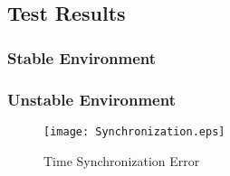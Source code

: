 \documentclass[Main]{subfiles}
\begin{document}

	\subsection{Test Results} %
	\label{sub:test_results}

		\subsubsection{Stable Environment} %
		\label{sub:stable_environment}
		

		\subsubsection{Unstable Environment} %
		\label{sub:unstable_environment}
			
			\begin{figure}[H]
				\centering
				\texttt{[image: Synchronization.eps]}
				\caption{Time Synchronization Error}
				\label{fig:Synchronization}
			\end{figure}

	

\end{document}
